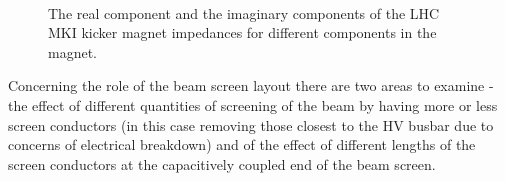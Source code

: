 \begin{figure}
\begin{center}
\\
\end{center}
\caption{The  real component and the  imaginary components of the LHC MKI kicker magnet impedances for different components in the magnet.}
\label{fig:mki-buildup-impedance}
\end{figure}


Concerning the role of the beam screen layout there are two areas to examine - the effect of different quantities of screening of the beam by having more or less screen conductors (in this case removing those closest to the HV busbar due to concerns of electrical breakdown) and of the effect of different lengths of the screen conductors at the capacitively coupled end of the beam screen.

